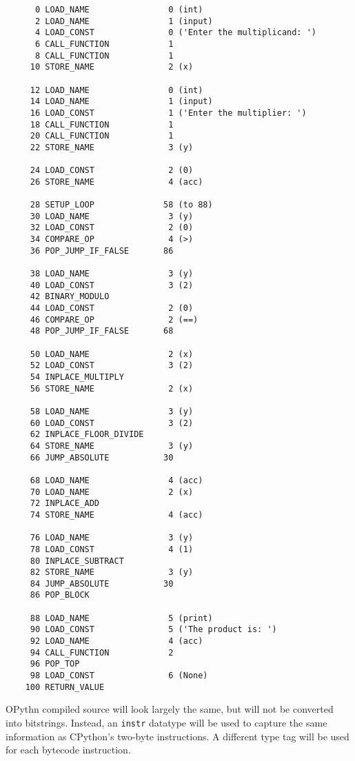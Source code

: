 \documentclass[11pt, twoside]{article}
\begin{document}
    \begin{lstlisting}
      0 LOAD_NAME                0 (int)
      2 LOAD_NAME                1 (input)
      4 LOAD_CONST               0 ('Enter the multiplicand: ')
      6 CALL_FUNCTION            1
      8 CALL_FUNCTION            1
     10 STORE_NAME               2 (x)

     12 LOAD_NAME                0 (int)
     14 LOAD_NAME                1 (input)
     16 LOAD_CONST               1 ('Enter the multiplier: ')
     18 CALL_FUNCTION            1
     20 CALL_FUNCTION            1
     22 STORE_NAME               3 (y)

     24 LOAD_CONST               2 (0)
     26 STORE_NAME               4 (acc)

     28 SETUP_LOOP              58 (to 88)
     30 LOAD_NAME                3 (y)
     32 LOAD_CONST               2 (0)
     34 COMPARE_OP               4 (>)
     36 POP_JUMP_IF_FALSE       86

     38 LOAD_NAME                3 (y)
     40 LOAD_CONST               3 (2)
     42 BINARY_MODULO
     44 LOAD_CONST               2 (0)
     46 COMPARE_OP               2 (==)
     48 POP_JUMP_IF_FALSE       68

     50 LOAD_NAME                2 (x)
     52 LOAD_CONST               3 (2)
     54 INPLACE_MULTIPLY
     56 STORE_NAME               2 (x)

     58 LOAD_NAME                3 (y)
     60 LOAD_CONST               3 (2)
     62 INPLACE_FLOOR_DIVIDE
     64 STORE_NAME               3 (y)
     66 JUMP_ABSOLUTE           30

     68 LOAD_NAME                4 (acc)
     70 LOAD_NAME                2 (x)
     72 INPLACE_ADD
     74 STORE_NAME               4 (acc)

     76 LOAD_NAME                3 (y)
     78 LOAD_CONST               4 (1)
     80 INPLACE_SUBTRACT
     82 STORE_NAME               3 (y)
     84 JUMP_ABSOLUTE           30
     86 POP_BLOCK

     88 LOAD_NAME                5 (print)
     90 LOAD_CONST               5 ('The product is: ')
     92 LOAD_NAME                4 (acc)
     94 CALL_FUNCTION            2
     96 POP_TOP
     98 LOAD_CONST               6 (None)
    100 RETURN_VALUE
    \end{lstlisting}
    OPythn compiled source will look largely the same, but will not be converted into bitstrings. Instead, an \texttt{instr} datatype will be used to capture the same information as CPython's two-byte instructions. A different type tag will be used for each bytecode instruction.
\end{document}
